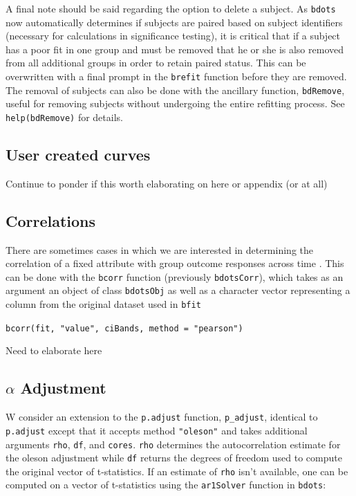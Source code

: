 \documentclass{article}
\newcommand{\xt}{\texttt}%
\begin{document}
A final note should be said regarding the option to delete a subject. As \xt{bdots} now automatically determines if subjects are paired based on subject identifiers (necessary for  calculations in significance testing), it is critical that if a subject has a poor fit in one group and must be removed that he or she is also removed from all additional groups in order to retain paired status. This can be overwritten with a final prompt in the \texttt{brefit} function before they are removed. The removal of subjects can also be done with the ancillary function, \texttt{bdRemove}, useful for removing subjects without undergoing the entire refitting process. See \xt{help(bdRemove)} for details.


\subsection{User created curves}

Continue to ponder if this worth elaborating on here or appendix (or at all)

\subsection{Correlations}

There are sometimes cases in which we are interested in determining the correlation of a fixed attribute with group outcome responses across time . This can be done with the \texttt{bcorr} function (previously \texttt{bdotsCorr}), which takes as an argument an object of class \texttt{bdotsObj} as well as a character vector representing a column from the original dataset used in \texttt{bfit}

\begin{center}
\xt{bcorr(fit, "value", ciBands, method = "pearson")} 
\end{center}

Need to elaborate here

\subsection{$\alpha$ Adjustment}

W consider an extension to the \texttt{p.adjust} function, \texttt{p\_adjust}, identical to \texttt{p.adjust} except that it accepts method \texttt{"oleson"} and takes additional arguments \texttt{rho}, \texttt{df}, and \texttt{cores}. \texttt{rho} determines the autocorrelation estimate for the oleson adjustment while \texttt{df} returns the degrees of freedom used to compute the original vector of t-statistics. If an estimate of \texttt{rho} isn't available, one can be computed on a vector of t-statistics using the \texttt{ar1Solver} function in \xt{bdots}:
\end{document}
